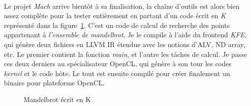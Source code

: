 \paragraph{}
Le projet \emph{Mach} arrive bientôt à sa finalisation, la chaîne d'outils est
alors bien assez complète pour la tester entièrement en partant d'un code écrit
en \emph{K} représenté dans la figure~\ref{mandel_k}. C'est un code de calcul de
recherche des points appartenant à \emph{l'ensemble de mandelbrot}. Je le
compile à l'aide du frontend \emph{KFE}, qui génère deux fichiers en LLVM IR
étendue avec les notions d'ALV, ND array, etc. Le premier contient la fonction
\emph{main}, et l'autre les tâches de calcul. Je passe ces deux derniers au
spécialisateur OpenCL, qui génère à son tour les codes \emph{kernel} et le code
hôte. Le tout est ensuite compilé pour créer finalement un binaire pour
plateforme OpenCL.

\begin{figure}[h!]
   
   \caption{Mandelbrot écrit en K}
   \label{mandel_k}
\end{figure}
